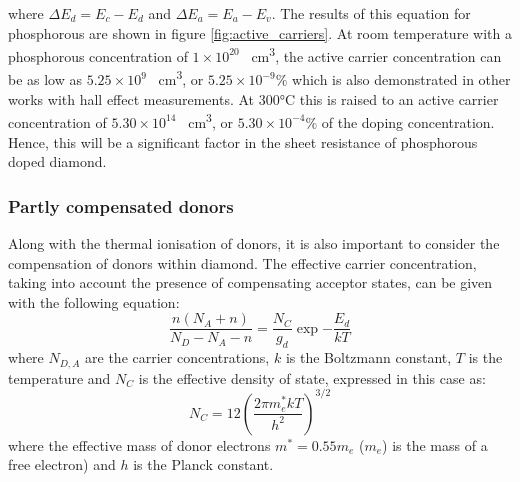 \begin{refsection}
where $\Delta E_{d}=E_{c}-E_{d}$ and $\Delta E_{a}=E_{a}-E_{v}$. The results of this equation for phosphorous are shown in figure \ref{fig:active_carriers}. At room temperature with a phosphorous concentration of $1\times10^{20}$ \si{\per\centi\metre\cubed}, the active carrier concentration can be as low as $5.25\times10^{9}$ \si{\per\centi\metre\cubed}, or $5.25\times10^{-9}\%$ which is also demonstrated in other works with hall effect measurements. At 300\si{\degreeCelsius} this is raised to an active carrier concentration of $5.30\times10^{14}$ \si{\per\centi\metre\cubed}, or $5.30\times10^{-4}\%$ of the doping concentration. Hence, this will be a significant factor in the sheet resistance of phosphorous doped diamond. 

\subsubsection{Partly compensated donors}
Along with the thermal ionisation of donors, it is also important to consider the compensation of donors within diamond. The effective carrier concentration, taking into account the presence of compensating acceptor states, can be given with the following equation:
\begin{equation}
    \frac{n\left(N_{A}+n\right)}{N_{D}-N_{A}-n} = \frac{N_{C}}{g_{d}}\exp{-\frac{E_{d}}{kT}}
    \label{eq:carrier_compensation_koizumi2018}
\end{equation}
where $N_{D,A}$ are the carrier concentrations, $k$ is the Boltzmann constant, $T$ is the temperature and $N_{C}$ is the effective density of state, expressed in this case as:
\begin{equation}
    N_{C} = 12\left(\frac{2\pi m^{*}_{e}kT}{h^{2}}\right)^{3/2}
    \label{eq:carrier_compensation_density_of_state}
\end{equation}
where the effective mass of donor electrons $m^{*} = 0.55m_{e}$ ($m_{e}$) is the mass of a free electron) and $h$ is the Planck constant.

\end{refsection}
